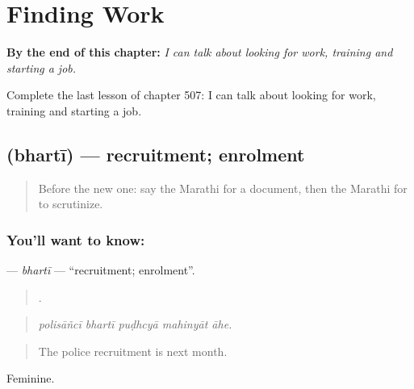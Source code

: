 
\chapter{Finding Work}
\label{ch:mr-finding-work}

\begin{chapteropening}
\textbf{By the end of this chapter:} \emph{I can talk about looking for work, training and starting a job.}

Complete the last lesson of chapter 507: I can talk about looking for work, training and starting a job.
\end{chapteropening}

\section[\texorpdfstring{\mr{भरती} (bhartī)}{भरती (bhartī)}]{ (bhartī) — recruitment; enrolment}

\label{lesson:MR-C507-bharti}



\begin{quote}
Before the new one: say the Marathi for a document, then the Marathi for to scrutinize.
\end{quote}

\subsection*{You'll want to know: }
\textbf{} — \emph{bhartī} — \textquotedblleft{}recruitment; enrolment\textquotedblright{}.

\begin{quote}
    .
\end{quote}

\begin{quote}
\emph{polisāñcī bhartī puḍhcyā mahinyāt āhe.}
\end{quote}

\begin{quote}
The police recruitment is next month.
\end{quote}

Feminine.

